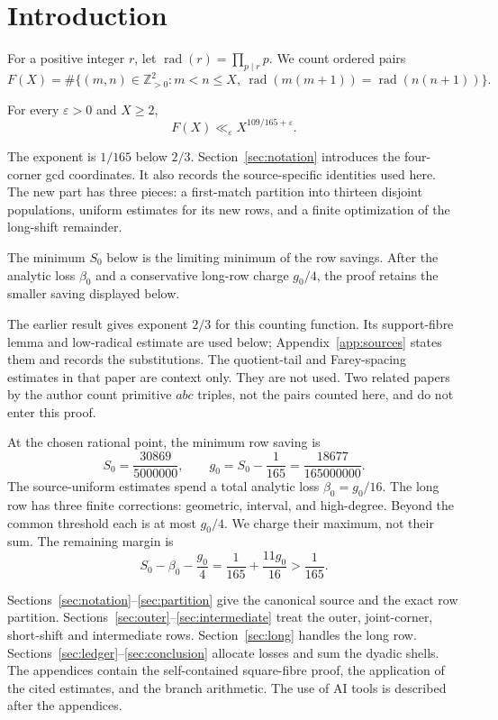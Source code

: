 \section{Introduction}

For a positive integer \(r\), let
\(\operatorname{rad}(r)=\prod_{p\mid r}p\). We count ordered pairs
\[
 F(X)=\#\{(m,n)\in\mathbb Z_{>0}^2:m<n\le X,\
       \operatorname{rad}(m(m+1))=\operatorname{rad}(n(n+1))\}.
\]

\begin{theorem}\label{thm:main}
For every \(\varepsilon>0\) and \(X\ge2\),
\[
                         F(X)\ll_\varepsilon X^{109/165+\varepsilon}.
\]
\end{theorem}

The exponent is \(1/165\) below \(2/3\). Section~\ref{sec:notation}
introduces the four-corner gcd coordinates. It also records the
source-specific identities used here. The new part has three pieces: a
first-match partition into thirteen disjoint populations, uniform
estimates for its new rows, and a finite optimization of the long-shift
remainder.

The minimum \(S_0\) below is the limiting minimum of the row savings.
After the analytic loss \(\beta_0\) and a conservative long-row charge
\(g_0/4\),
the proof retains the smaller saving displayed below.

The earlier result \cite[Theorem~1]{Paper1} gives exponent \(2/3\) for
this counting function. Its support-fibre lemma and low-radical estimate
are used below; Appendix~\ref{app:sources} states them and records the
substitutions. The quotient-tail and Farey-spacing estimates in that paper
are context only. They are not used. Two related papers by the author
\cite{Zhang712,ZhangE20} count primitive \(abc\) triples, not the pairs
counted here, and do not enter this proof.

At the chosen rational point, the minimum row saving is
\[
 S_0=\frac{30869}{5000000},\qquad
 g_0=S_0-\frac1{165}=\frac{18677}{165000000}.
\]
The source-uniform estimates spend a total analytic loss
\(\beta_0=g_0/16\). The long row has three finite corrections: geometric,
interval, and high-degree. Beyond the common threshold each is at most
\(g_0/4\). We charge their maximum, not their sum. The remaining margin is
\[
 S_0-\beta_0-\frac{g_0}{4}
 =\frac1{165}+\frac{11g_0}{16}>\frac1{165}.
\]

Sections~\ref{sec:notation}--\ref{sec:partition} give the canonical source
and the exact row partition. Sections~\ref{sec:outer}--\ref{sec:intermediate}
treat the outer, joint-corner, short-shift and intermediate rows.
Section~\ref{sec:long} handles the long row. Sections~\ref{sec:ledger}--\ref{sec:conclusion}
allocate losses and sum the dyadic shells. The appendices contain the
self-contained square-fibre proof, the application of the cited estimates, and the
branch arithmetic. The use of AI tools is described after the appendices.

